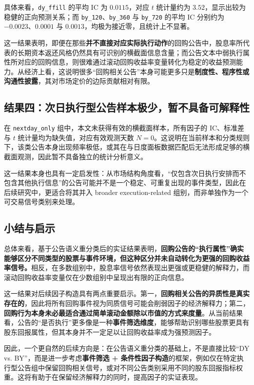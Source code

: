 \documentclass[a4paper,10pt]{article}
\begin{document}
具体来看，\texttt{dy\_ffill} 的平均 IC 为 $0.0115$，对应 $t$ 统计量约为 $3.52$，显示出较为稳健的正向预测关系；而 \texttt{by\_120}、\texttt{by\_360} 与 \texttt{by\_720} 的平均 IC 分别约为 $-0.0023$、$0.0001$ 与 $0.0013$，均极为接近零，且统计上不显著。

这一结果表明，即便在那些\textbf{并不直接对应实际执行动作}的回购公告中，股息率所代表的长期资本返还风格仍然具有可识别的横截面信息含量；而公告文本中弱执行属性所对应的回购信息，则很难通过滚动回购收益率变量转化为稳定的收益预测能力。从经济上看，这说明很多“回购相关公告”本身可能更多只是\textbf{制度性、程序性或沟通性披露}，其对市场定价的边际贡献相对有限。

\subsection{结果四：次日执行型公告样本极少，暂不具备可解释性}

在 \texttt{nextday\_only} 组中，本文未获得有效的横截面样本，所有因子的 IC、标准差与 $t$ 统计量均为缺失值，对应有效观测天数 $N=0$。这说明在当前样本和分类规则下，该类公告本身出现频率极低，或其在与日度面板数据匹配后无法形成足够的横截面观测，因此暂不具备独立的统计分析意义。

这一结果本身也具有一定启发性：从市场结构角度看，“仅包含次日执行安排而不包含其他执行信息”的公告可能并不是一个稳定、可重复出现的事件类型，因此在后续研究中，更适合将其并入 broader execution-related 组别，而非单独作为一个可交易信号类别来处理。

\subsection{小结与启示}

总体来看，基于公告语义重分类后的实证结果表明，\textbf{回购公告的“执行属性”确实能够区分不同类型的股票与事件环境，但这种区分并未自动转化为更强的回购收益率信号。}相反，在多数组别中，股息率信号依然表现出更强或更稳健的解释力，而滚动回购收益率变量仅在少数组别中呈现出有限的正向信息。

这一结果对后续因子构造具有两点重要启示。第一，\textbf{回购相关公告的异质性是真实存在的}，因此将所有回购事件视为同质信号可能会削弱因子的经济解释力；第二，\textbf{回购行为本身未必最适合通过简单滚动金额除以市值的方式来度量}。从当前结果看，公告的“是否执行”更多像是一种\textbf{事件筛选维度}，能够帮助识别哪些股票更具有股东回报属性，但其本身并不一定足以让回购收益率成为强预测因子。

因此，一个更自然的后续方向是：在公告语义重分类的基础上，不是直接比较“DY vs. BY”，而是进一步考虑\textbf{事件筛选 + 条件性因子构造}的框架，例如仅在特定执行型公告组中保留回购相关信号，或对不同公告类别采用不同的股东回报指标权重。这将有助于在保留经济解释力的同时，提高因子的实证表现。
\end{document}
